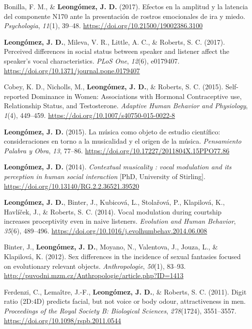 \documentclass[11pt, a4paper]{awesome-cv}
\begin{document}
\leavevmode\hypertarget{ref-BonillaCarreno2017}{}%
Bonilla, F. M., \& \textbf{Leongómez, J. D.} (2017). {Efectos en la
amplitud y la latencia del componente N170 ante la presentaci{ó}n de
rostros emocionales de ira y miedo}. \emph{Psychologia}, \emph{11}(1),
39--48. \url{https://doi.org/10.21500/19002386.3100}

\leavevmode\hypertarget{ref-Leongomez2017}{}%
\textbf{Leongómez, J. D.}, Mileva, V. R., Little, A. C., \& Roberts, S.
C. (2017). {Perceived differences in social status between speaker and
listener affect the speaker's vocal characteristics}. \emph{PLoS One},
\emph{12}(6), e0179407.
\url{https://doi.org/10.1371/journal.pone.0179407}

\leavevmode\hypertarget{ref-Cobey2015}{}%
Cobey, K. D., Nicholls, M., \textbf{Leongómez, J. D.}, \& Roberts, S. C.
(2015). {Self-reported Dominance in Women: Associations with Hormonal
Contraceptive use, Relationship Status, and Testosterone}.
\emph{Adaptive Human Behavior and Physiology}, \emph{1}(4), 449--459.
\url{https://doi.org/10.1007/s40750-015-0022-8}

\leavevmode\hypertarget{ref-Leongomez2015}{}%
\textbf{Leongómez, J. D.} (2015). {La m{ú}sica como objeto de estudio
cient{í}fico: consideraciones en torno a la musicalidad y el origen de
la m{ú}sica}. \emph{Pensamiento Palabra y Obra}, \emph{13}, 77--86.
\url{https://doi.org/10.17227/2011804X.15PPO77.86}

\leavevmode\hypertarget{ref-Leongomez2014a}{}%
\textbf{Leongómez, J. D.} (2014). \emph{{Contextual musicality : vocal
modulation and its perception in human social interaction}} {[}PhD,
University of Stirling{]}.
\url{https://doi.org/10.13140/RG.2.2.36521.39520}

\leavevmode\hypertarget{ref-Leongomez2014}{}%
\textbf{Leongómez, J. D.}, Binter, J., Kubicová, L., Stolařová, P.,
Klapilová, K., Havlíček, J., \& Roberts, S. C. (2014). {Vocal modulation
during courtship increases proceptivity even in naive listeners}.
\emph{Evolution and Human Behavior}, \emph{35}(6), 489--496.
\url{https://doi.org/10.1016/j.evolhumbehav.2014.06.008}

\leavevmode\hypertarget{ref-Binter2012}{}%
Binter, J., \textbf{Leongómez, J. D.}, Moyano, N., Valentova, J., Jouza,
L., \& Klapilová, K. (2012). {Sex differences in the incidence of sexual
fantasies focused on evolutionary relevant objects.}
\emph{Anthropologie}, \emph{50}(1), 83--93.
\url{http://puvodni.mzm.cz/Anthropologie/article.php?ID=1413}

\leavevmode\hypertarget{ref-Ferdenzi2011}{}%
Ferdenzi, C., Lemaître, J.-F., \textbf{Leongómez, J. D.}, \& Roberts, S.
C. (2011). {Digit ratio (2D:4D) predicts facial, but not voice or body
odour, attractiveness in men.} \emph{Proceedings of the Royal Society B:
Biological Sciences}, \emph{278}(1724), 3551--3557.
\url{https://doi.org/10.1098/rspb.2011.0544}
\end{document}
